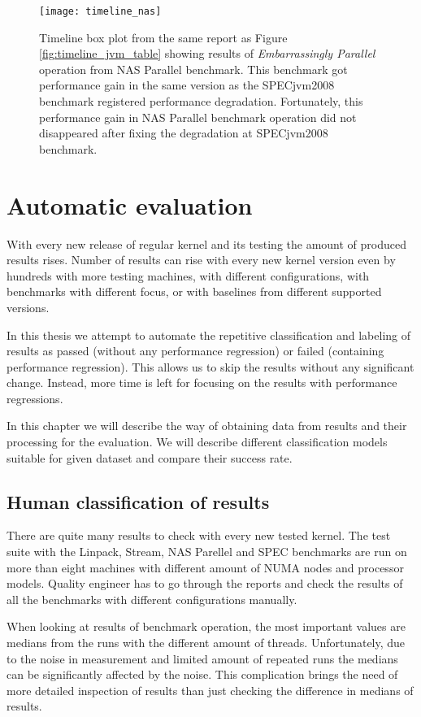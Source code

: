 \begin{figure}
  \centering
  \texttt{[image: timeline\_nas]}
  \caption{Timeline box plot from the same report as Figure
    \ref{fig:timeline_jvm_table} showing results of \emph{Embarrassingly
    Parallel} operation from NAS Parallel benchmark. This benchmark got
    performance gain in the same version as the SPECjvm2008 benchmark registered
    performance degradation. Fortunately, this performance gain in NAS Parallel
    benchmark operation did not disappeared after fixing the degradation at
    SPECjvm2008 benchmark.}
  \label{fig:timeline_nas}
\end{figure}



\chapter{Automatic evaluation} \label{ch:ai}
With every new release of regular kernel and its testing the amount of produced
results rises. Number of results can rise with every new kernel version even by
hundreds with more testing machines, with different configurations, with
benchmarks with different focus, or with baselines from different supported
versions.

In this thesis we attempt to automate the repetitive classification and
labeling of results as passed (without any performance regression) or failed
(containing performance regression). This allows us to skip the results without
any significant change. Instead, more time is left for focusing on the results
with performance regressions.

In this chapter we will describe the way of obtaining data from results and
their processing for the evaluation. We will describe different classification
models suitable for given dataset and compare their success rate.

\section{Human classification of results}
There are quite many results to check with every new tested kernel. The test
suite with the Linpack, Stream, NAS Parellel and SPEC benchmarks are run on more
than eight machines with different amount of NUMA nodes and processor models.
Quality engineer has to go through the reports and check the results of all the benchmarks
with different configurations manually.

When looking at results of benchmark operation, the most important values are
medians from the runs with the different amount of threads. Unfortunately, due
to the noise in measurement
and limited amount of repeated runs the medians can be significantly affected by
the noise. This complication brings the need of more detailed inspection of
results than just checking the difference in medians of results.

